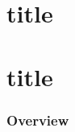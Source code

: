 \documentclass{beamer}
\begin{document}
\section{title}
\section{title}

\begin{frame}
\frametitle{Overview}
\end{frame}
\end{document}
